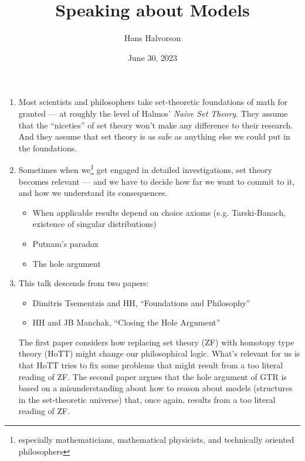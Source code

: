 \documentclass[fleqn]{tufte-handout}
\title{Speaking about Models}
\author{Hans Halvorson}
\date{June 30, 2023}
\begin{document}
\maketitle

\begin{enumerate}

\item Most scientists and philosophers take set-theoretic foundations
  of math for granted --- at roughly the level of Halmos' \emph{Naive
    Set Theory}. They assume that the ``niceties'' of set theory won't
  make any difference to their research. And they assume that set
  theory is as safe as anything else we could put in the foundations.

\item Sometimes when we\footnote{especially mathematicians,
    mathematical physicists, and technically oriented philosophers}
  get engaged in detailed investigations, set theory becomes relevant
  --- and we have to decide how far we want to commit to it, and how
  we understand its consequences.

  \begin{itemize}
  \item When applicable results depend on choice axioms
    (e.g. Tarski-Banach, existence of singular distributions)
  \item Putnam's paradox
  \item The hole argument
  \end{itemize}
  
  
\item This talk descends from two papers:
  \begin{itemize}
  \item Dimitris Tsementzis and HH, ``Foundations and Philosophy''
  \item HH and JB Manchak, ``Closing the Hole Argument''
  \end{itemize} The first paper considers how replacing set theory
  (ZF) with homotopy type theory (HoTT) might change our philosophical
  logic. What's relevant for us is that HoTT tries to fix some
  problems that might result from a too literal reading of ZF. The
  second paper argues that the hole argument of GTR is based on a
  misunderstanding about how to reason about models (structures in the
  set-theoretic universe) that, once again, results from a too literal
  reading of ZF.


\end{enumerate}
\end{document}
